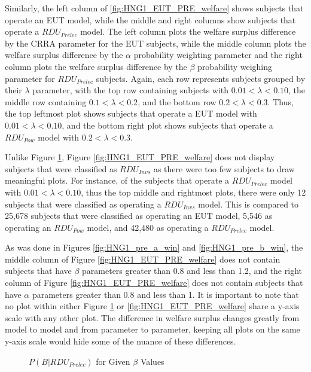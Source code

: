 \documentclass[../main.tex]{subfiles}
\begin{document}
Similarly, the left column of \ref{fig:HNG1_EUT_PRE_welfare} shows subjects that operate an EUT model, while the middle and right columns show subjects that operate a $\mathit{RDU_{Prelec}}$ model.
The left column plots the welfare surplus difference by the CRRA parameter for the EUT subjects, while the middle column plots the welfare surplus difference by the $\alpha$ probability weighting parameter and the right column plots the welfare surplus difference by the $\beta$ probability weighing parameter for $\mathit{RDU_{Prelec}}$ subjects.
Again, each row represents subjects grouped by their $\lambda$ parameter, with the top row containing subjects with $0.01 < \lambda < 0.10$, the middle row containing $0.1 < \lambda < 0.2$, and the bottom row $0.2 < \lambda < 0.3$.
Thus, the top leftmost plot shows subjects that operate a EUT model with $0.01 < \lambda < 0.10$, and the bottom right plot shows subjects that operate a $\mathit{RDU_{Pow}}$ model with $0.2 < \lambda < 0.3$.

Unlike Figure \ref{fig:HNG1_POW_INV_welfare}, Figure \ref{fig:HNG1_EUT_PRE_welfare} does not display subjects that were classified as $\mathit{RDU_{Invs}}$ as there were too few subjects to draw meaningful plots.
For instance, of the subjects that operate a $\mathit{RDU_{Prelec}}$ model with $0.01 < \lambda < 0.10$, thus the top middle and rightmost plots, there were only 12 subjects that were classified as operating a $\mathit{RDU_{Invs}}$ model.
This is compared to 25,678 subjects that were classified as operating an EUT model, 5,546 as operating an $\mathit{RDU_{Pow}}$ model, and 42,480 as operating a $\mathit{RDU_{Prelec}}$ model.

As was done in Figures \ref{fig:HNG1_pre_a_win} and \ref{fig:HNG1_pre_b_win}, the middle column of Figure \ref{fig:HNG1_EUT_PRE_welfare} does not contain subjects that have $\beta$ parameters greater than 0.8 and less than 1.2, and the right column of Figure \ref{fig:HNG1_EUT_PRE_welfare} does not contain subjects that have $\alpha$ parameters greater than 0.8 and less than 1.
It is important to note that no plot within either Figure \ref{fig:HNG1_POW_INV_welfare} or \ref{fig:HNG1_EUT_PRE_welfare} share a y-axis scale with any other plot.
The difference in welfare surplus changes greatly from model to model and from parameter to parameter, keeping all plots on the same y-axis scale would hide some of the nuance of these differences.

\begin{figure}[hp!]
	\center
	\caption{$P(B|RDU_{Prelec})$ for Given $\beta$ Values}
	\label{fig:HNG1_POW_INV_welfare}
\end{figure}
\end{document}
